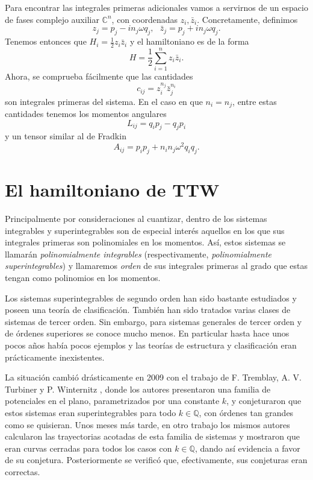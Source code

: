 \documentclass[12pt,a4paper,twoside]{article}
\theoremstyle{definition} \newtheorem{defn}[thm]{Definición}
\theoremstyle{definition} \newtheorem{ejemplo}[thm]{Ejemplo}
\theoremstyle{definition} \newtheorem{ejercicio}[thm]{Ejercicio}
\theoremstyle{remark} \newtheorem*{obs}{Observación}
\def\CC{\mathbb{C}}
\def\QQ{\mathbb{Q}}
\begin{document}
Para encontrar las integrales primeras adicionales vamos a servirnos de un espacio de fases complejo auxiliar $\CC^n$, con coordenadas $z_i, \bar{z}_i$. Concretamente, definimos
\begin{equation}
  z_j=p_j-in_j\omega q_j,\ \ \  \bar{z}_j=p_j+in_j\omega q_j.  
\end{equation}
Tenemos entonces que $H_i=\frac{1}{2}z_i\bar{z}_i$ y el hamiltoniano es de la forma
\begin{equation}
  H=\frac{1}{2}\sum_{i=1}^n z_i\bar{z}_i. 
\end{equation}
Ahora, se comprueba fácilmente que las cantidades
\begin{equation}
  c_{ij}=z_i^{n_j}\bar{z}_j^{n_i} 
\end{equation}
son integrales primeras del sistema. En el caso en que $n_i=n_j$, entre estas cantidades tenemos los momentos angulares
\begin{equation}
  L_{ij}=q_ip_j-q_jp_i 
\end{equation}
y un tensor similar al de Fradkin
\begin{equation}
  A_{ij}=p_ip_j+n_in_j\omega^2 q_iq_j. 
\end{equation}

\section{El hamiltoniano de TTW}
Principalmente por consideraciones al cuantizar, dentro de los sistemas integrables y superintegrables son de especial interés aquellos en los que sus integrales primeras son polinomiales en los momentos. Así, estos sistemas se llamarán \emph{polinomialmente integrables} (respectivamente, \emph{polinomialmente superintegrables}) y llamaremos \emph{orden} de sus integrales primeras al grado que estas tengan como polinomios en los momentos.

Los sistemas superintegrables de segundo orden han sido bastante estudiados y poseen una teoría de clasificación. También han sido tratados varias clases de sistemas de tercer orden. Sin embargo, para sistemas generales de tercer orden y de órdenes superiores se conoce mucho menos. En particular hasta hace unos pocos años había pocos ejemplos y las teorías de estructura y clasificación eran prácticamente inexistentes. 

La situación cambió drásticamente en 2009 con el trabajo de F. Tremblay, A. V. Turbiner y P. Winternitz \cite{ttw1}, donde los autores presentaron una familia de potenciales en el plano, parametrizados por una constante $k$, y conjeturaron que estos sistemas eran superintegrables para todo $k\in \QQ$, con órdenes tan grandes como se quisieran. Unos meses más tarde, en otro trabajo \cite{ttw2} los mismos autores calcularon las trayectorias acotadas de esta familia de sistemas y mostraron que eran curvas cerradas para todos los casos con $k \in \QQ$, dando así evidencia a favor de su conjetura. Posteriormente se verificó que, efectivamente, sus conjeturas eran correctas.
\end{document}
